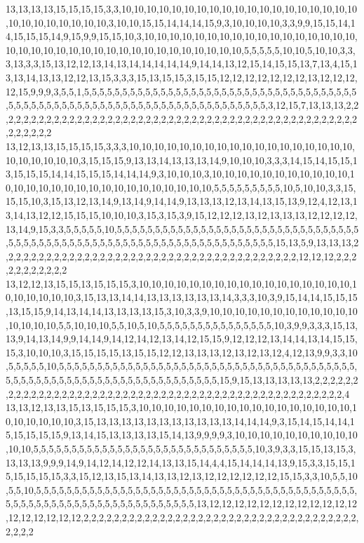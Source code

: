 13,13,13,13,15,15,15,15,3,3,10,10,10,10,10,10,10,10,10,10,10,10,10,10,10,10,10,10,10,10,10,10,10,10,10,10,10,3,10,10,15,15,14,14,14,15,9,3,10,10,10,10,3,3,9,9,15,15,14,14,15,15,15,14,9,15,9,9,15,15,10,3,10,10,10,10,10,10,10,10,10,10,10,10,10,10,10,10,10,10,10,10,10,10,10,10,10,10,10,10,10,10,10,10,10,10,10,10,5,5,5,5,5,10,10,5,10,10,3,3,3,13,3,3,15,13,12,12,13,14,13,14,14,14,14,14,9,14,14,13,12,15,14,15,15,13,7,13,4,15,13,13,14,13,13,12,12,13,15,3,3,3,15,13,15,15,3,15,15,12,12,12,12,12,12,12,13,12,12,12,12,15,9,9,9,3,5,5,1,5,5,5,5,5,5,5,5,5,5,5,5,5,5,5,5,5,5,5,5,5,5,5,5,5,5,5,5,5,5,5,5,5,5,5,5,5,5,5,5,5,5,5,5,5,5,5,5,5,5,5,5,5,5,5,5,5,5,5,5,5,5,5,5,5,5,5,5,5,5,3,12,15,7,13,13,13,2,2,2,2,2,2,2,2,2,2,2,2,2,2,2,2,2,2,2,2,2,2,2,2,2,2,2,2,2,2,2,2,2,2,2,2,2,2,2,2,2,2,2,2,2,2,2,2,2,2,2,2,2,2
13,12,13,13,15,15,15,15,3,3,3,10,10,10,10,10,10,10,10,10,10,10,10,10,10,10,10,10,10,10,10,10,10,10,10,3,15,15,15,9,13,13,14,13,13,13,14,9,10,10,10,3,3,3,14,15,14,15,15,13,15,15,15,14,14,15,15,15,14,14,14,9,3,10,10,10,3,10,10,10,10,10,10,10,10,10,10,10,10,10,10,10,10,10,10,10,10,10,10,10,10,10,10,10,10,5,5,5,5,5,5,5,5,5,10,5,10,10,3,3,15,15,15,10,3,15,13,12,13,14,9,13,14,9,14,14,9,13,13,13,12,13,14,13,15,13,9,12,4,12,13,13,14,13,12,12,15,15,15,10,10,10,3,15,3,15,3,9,15,12,12,12,13,12,13,13,13,12,12,12,12,13,14,9,15,3,3,5,5,5,5,5,10,5,5,5,5,5,5,5,5,5,5,5,5,5,5,5,5,5,5,5,5,5,5,5,5,5,5,5,5,5,5,5,5,5,5,5,5,5,5,5,5,5,5,5,5,5,5,5,5,5,5,5,5,5,5,5,5,5,5,5,5,5,5,5,5,5,5,5,15,13,5,9,13,13,13,2,2,2,2,2,2,2,2,2,2,2,2,2,2,2,2,2,2,2,2,2,2,2,2,2,2,2,2,2,2,2,2,2,2,2,2,2,2,2,12,12,12,2,2,2,2,2,2,2,2,2,2,2
13,12,12,13,15,15,13,15,15,15,3,10,10,10,10,10,10,10,10,10,10,10,10,10,10,10,10,10,10,10,10,10,10,10,3,15,13,13,14,14,13,13,13,13,13,13,14,3,3,3,10,3,9,15,14,14,15,15,15,13,15,15,9,14,13,14,14,13,13,13,13,15,3,10,3,3,9,10,10,10,10,10,10,10,10,10,10,10,10,10,10,10,10,5,5,10,10,10,5,5,10,5,10,5,5,5,5,5,5,5,5,5,5,5,5,5,5,5,10,3,9,9,3,3,3,15,13,13,9,14,13,14,9,9,14,14,9,14,12,14,12,13,14,12,15,15,9,12,12,12,13,14,14,13,14,15,15,15,3,10,10,10,3,15,15,15,15,13,15,15,12,12,13,13,13,12,13,12,13,12,4,12,13,9,9,3,3,10,5,5,5,5,5,10,5,5,5,5,5,5,5,5,5,5,5,5,5,5,5,5,5,5,5,5,5,5,5,5,5,5,5,5,5,5,5,5,5,5,5,5,5,5,5,5,5,5,5,5,5,5,5,5,5,5,5,5,5,5,5,5,5,5,5,5,5,5,5,5,5,5,5,15,9,15,13,13,13,13,13,2,2,2,2,2,2,2,2,2,2,2,2,2,2,2,2,2,2,2,2,2,2,2,2,2,2,2,2,2,2,2,2,2,2,2,2,2,2,2,2,2,2,2,2,2,2,2,2,2,2,4
13,13,12,13,13,15,13,15,15,15,3,10,10,10,10,10,10,10,10,10,10,10,10,10,10,10,10,10,10,10,10,10,10,10,3,15,13,13,13,13,13,13,13,13,13,13,13,14,14,14,9,3,15,14,15,14,14,15,15,15,15,15,9,13,14,15,13,13,13,13,15,14,13,9,9,9,9,3,10,10,10,10,10,10,10,10,10,10,10,10,5,5,5,5,5,5,5,5,5,5,5,5,5,5,5,5,5,5,5,5,5,5,5,5,5,5,5,5,5,10,3,9,3,3,15,15,13,15,3,13,13,13,9,9,9,14,9,14,12,14,12,12,14,13,13,15,14,4,4,15,14,14,14,13,9,15,3,3,15,15,15,15,15,15,15,3,3,15,12,13,15,13,14,13,13,12,13,12,12,12,12,12,12,15,15,3,3,10,5,5,10,5,5,10,5,5,5,5,5,5,5,5,5,5,5,5,5,5,5,5,5,5,5,5,5,5,5,5,5,5,5,5,5,5,5,5,5,5,5,5,5,5,5,5,5,5,5,5,5,5,5,5,5,5,5,5,5,5,5,5,5,5,5,5,5,5,5,5,5,5,5,13,12,12,12,12,12,12,12,12,12,12,12,12,12,12,12,12,12,12,2,2,2,2,2,2,2,2,2,2,2,2,2,2,2,2,2,2,2,2,2,2,2,2,2,2,2,2,2,2,2,2,2,2,2,2,2,2,2,2

